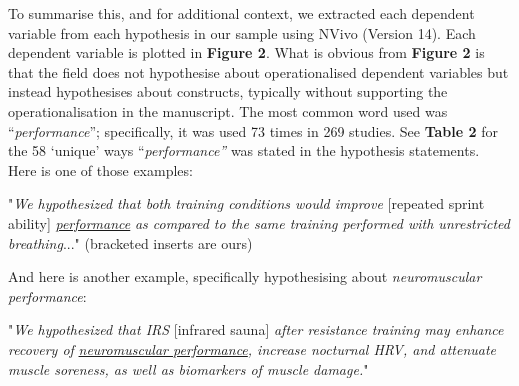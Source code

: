 \documentclass[
]{article}
\begin{document}
To summarise this, and for additional context, we extracted each
dependent variable from each hypothesis in our sample using NVivo
(Version 14). Each dependent variable is plotted in \textbf{Figure 2}.
What is obvious from \textbf{Figure 2} is that the field does not
hypothesise about operationalised dependent variables but instead
hypothesises about constructs, typically without supporting the
operationalisation in the manuscript. The most common word used was
``\emph{performance}''; specifically, it was used 73 times in 269
studies. See \textbf{Table 2} for the 58 `unique' ways
``\emph{performance''} was stated in the hypothesis statements. Here is
one of those examples:

\begin{center}

"\textit{We hypothesized that both training conditions would improve} [repeated sprint ability] \underline{\textit{performance}} \textit{as compared to the same training performed with unrestricted breathing}..." (bracketed inserts are ours)

\end{center}

And here is another example, specifically hypothesising about
\emph{neuromuscular performance}:

\begin{center}

"\textit{We hypothesized that IRS} [infrared sauna] \textit{after resistance training may enhance recovery of} \underline{\textit{neuromuscular performance}}\textit{, increase nocturnal HRV, and attenuate muscle soreness, as well as biomarkers of muscle damage.}"

\end{center}
\end{document}
